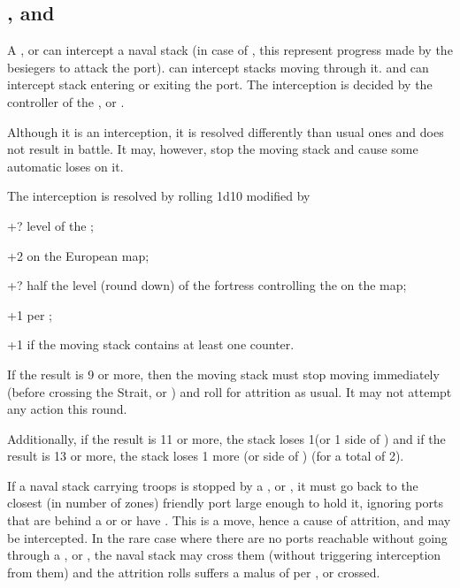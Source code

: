 \subsection{\Presidios, \StraitFort and \USURE}
A \Presidio, \StraitFort or \USURE can intercept a naval stack (in case of
\USURE, this represent progress made by the besiegers to attack the
port). \StraitFort can intercept stacks moving through it. \Presidios and
\USURE can intercept stack entering or exiting the port. The interception is
decided by the controller of the \Presidio, \StraitFort or \USURE.

Although it is an interception, it is resolved differently than usual ones and
does not result in battle. It may, however, stop the moving stack and cause
some automatic loses on it.

The interception is resolved by rolling 1d10 modified by
\begin{modlist}
\item[+?] level of the \Presidio;
\item[+2] \StraitFort on the European map;
\item[+?] half the level (round down) of the fortress controlling the
  \StraitFort on the \ROTW map;
\item[+1] per \USURE\faceplus;
\item[+1] if the moving stack contains at least one \FLEET counter.
\end{modlist}

If the result is 9 or more, then the moving stack must stop moving immediately
(before crossing the Strait, \Presidio or \USURE) and roll for attrition as
usual. It may not attempt any action this round.

Additionally, if the result is 11 or more, the stack loses 1\ND (or 1 side of
\corsaire) and if the result is 13 or more, the stack loses 1 more \ND (or
side of \corsaire) (for a total of 2).

If a naval stack carrying troops is stopped by a \Presidio, \USURE or
\StraitFort, it must go back to the closest (in number of zones) friendly port
large enough to hold it, ignoring ports that are behind a \Presidio or
\StraitFort or have \USURE. This is a move, hence a cause of attrition, and
may be intercepted. In the rare case where there are no ports reachable
without going through a \Presidio, \StraitFort or \USURE, the naval stack may
cross them (without triggering interception from them) and the attrition rolls
suffers a malus of  per \Presidio, \StraitFort or \USURE crossed.

